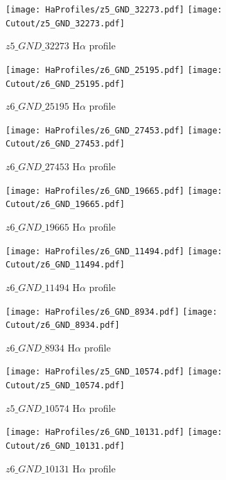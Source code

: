 \documentclass[12pt,english]{article}
\begin{document}
\clearpage
\begin{figure}
\begin{center}\texttt{[image: HaProfiles/z5\_GND\_32273.pdf]}
\texttt{[image: Cutout/z5\_GND\_32273.pdf]}
\caption{$z5\_GND\_32273$ H$\alpha$ profile}
\end{center}
\end{figure}
\clearpage
\begin{figure}
\begin{center}\texttt{[image: HaProfiles/z6\_GND\_25195.pdf]}
\texttt{[image: Cutout/z6\_GND\_25195.pdf]}
\caption{$z6\_GND\_25195$ H$\alpha$ profile}
\end{center}
\end{figure}
\clearpage
\begin{figure}
\begin{center}\texttt{[image: HaProfiles/z6\_GND\_27453.pdf]}
\texttt{[image: Cutout/z6\_GND\_27453.pdf]}
\caption{$z6\_GND\_27453$ H$\alpha$ profile}
\end{center}
\end{figure}
\clearpage
\begin{figure}
\begin{center}\texttt{[image: HaProfiles/z6\_GND\_19665.pdf]}
\texttt{[image: Cutout/z6\_GND\_19665.pdf]}
\caption{$z6\_GND\_19665$ H$\alpha$ profile}
\end{center}
\end{figure}
\clearpage
\begin{figure}
\begin{center}\texttt{[image: HaProfiles/z6\_GND\_11494.pdf]}
\texttt{[image: Cutout/z6\_GND\_11494.pdf]}
\caption{$z6\_GND\_11494$ H$\alpha$ profile}
\end{center}
\end{figure}
\clearpage
\begin{figure}
\begin{center}\texttt{[image: HaProfiles/z6\_GND\_8934.pdf]}
\texttt{[image: Cutout/z6\_GND\_8934.pdf]}
\caption{$z6\_GND\_8934$ H$\alpha$ profile}
\end{center}
\end{figure}
\clearpage
\begin{figure}
\begin{center}\texttt{[image: HaProfiles/z5\_GND\_10574.pdf]}
\texttt{[image: Cutout/z5\_GND\_10574.pdf]}
\caption{$z5\_GND\_10574$ H$\alpha$ profile}
\end{center}
\end{figure}
\clearpage
\begin{figure}
\begin{center}\texttt{[image: HaProfiles/z6\_GND\_10131.pdf]}
\texttt{[image: Cutout/z6\_GND\_10131.pdf]}
\caption{$z6\_GND\_10131$ H$\alpha$ profile}
\end{center}
\end{figure}
\end{document}
